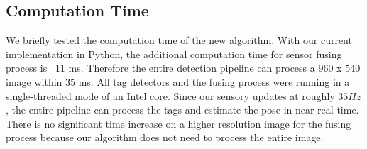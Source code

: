 \subsection{Computation Time}
We briefly tested the computation time of the new algorithm. With our current implementation in Python, the additional computation time for sensor fusing process is ~$11$ ms. Therefore the entire detection pipeline can process a $960$ x $540$ image within $35$ ms. All tag detectors and the fusing process were running in a single-threaded mode of an Intel core. Since our sensory updates at roughly $35Hz$, the entire pipeline can process the tags and estimate the pose in near real time. There is no significant time increase on a higher resolution image for the fusing process because our algorithm does not need to process the entire image.